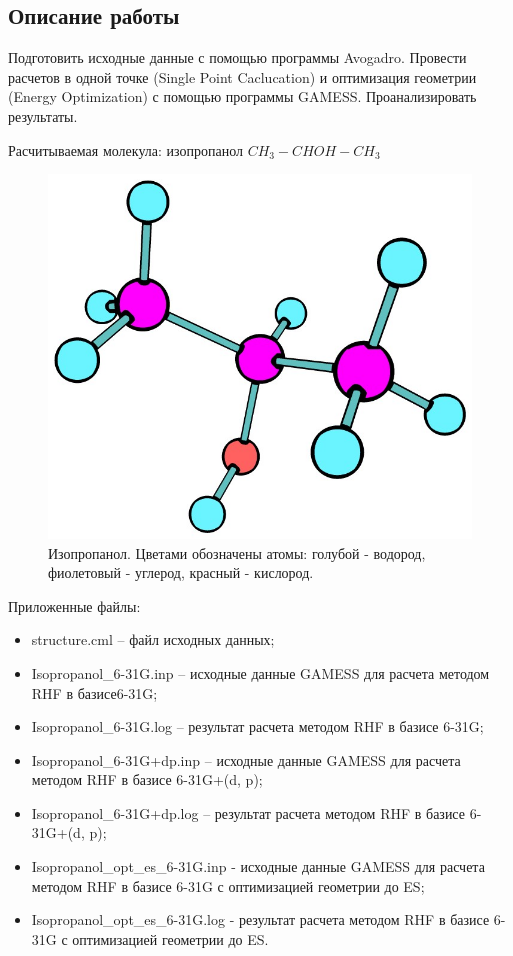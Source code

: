 \subsection{Описание работы}
Подготовить исходные данные с помощью программы Avogadro. Провести расчетов в одной точке (Single Point Caclucation) и оптимизация геометрии (Energy Optimization) с помощью программы GAMESS. Проанализировать результаты.

Расчитываемая молекула: изопропанол $CH_3 - CHOH - CH_3$
\begin{figure}[H]
\centering
\captionsetup{justification=centering}
\includegraphics[scale=0.4]{fig/0.jpg}
\caption{Изопропанол. Цветами обозначены атомы: голубой - водород, фиолетовый - углерод, красный - кислород.}
\end{figure}

Приложенные файлы:
\begin{itemize}
    \item structure.cml – файл исходных данных;
    \item Isopropanol\_6-31G.inp – исходные данные GAMESS для расчета методом RHF в базисе6-31G;
    \item Isopropanol\_6-31G.log – результат расчета методом RHF в базисе 6-31G;
    \item Isopropanol\_6-31G+dp.inp – исходные данные GAMESS для расчета методом RHF в базисе 6-31G+(d, p);
    \item Isopropanol\_6-31G+dp.log – результат расчета методом RHF в базисе 6-31G+(d, p);
    \item Isopropanol\_opt\_es\_6-31G.inp - исходные данные GAMESS для расчета методом RHF в базисе 6-31G с оптимизацией геометрии до ES;
    \item Isopropanol\_opt\_es\_6-31G.log - результат расчета методом RHF в базисе 6-31G с оптимизацией геометрии до ES.
\end{itemize}{}

